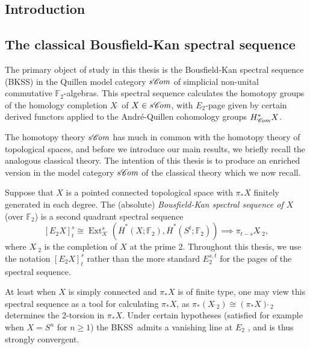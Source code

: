 \documentclass[11pt]{amsart} \renewcommand{\baselinestretch}{1.2}
\theoremstyle{plain}
\numberwithin{equation}{section} %
\theoremstyle{plain}
\numberwithin{equation}{chapter} %
\DeclareMathOperator{\Ext}{Ext}
\newcommand{\scrL}{\mathscr{L}}
\newcommand{\scrC}{\mathscr{C}}
\newcommand{\calk}{\mathcal{K}}
\newcommand{\F}{\mathbb{F}}
\newcommand{\algs}{{\scrC\!\textit{\normalfont\textit{om}}}}
\newcommand{\liealgs}{{\scrL\!\textit{ie}}}
\newcommand{\Ftwo}{\F_2}
\newcommand{\E}[5]{[E^{#1}_{#2}#3]^{#4}_{#5}}
\newcommand{\BKSS}{BKSS}
\newcommand{\SectionOrChapter}[1]{\section{\textbf{#1}}}
\newcommand{\SubsectionOrSection}[1]{\subsection{#1}}
\begin{document}
\begin{Introduction}
\SectionOrChapter{Introduction}
\label{intropart1}

\SubsectionOrSection{The classical Bousfield-Kan spectral sequence}
\label{Classicalstuff}

The primary object of study in this thesis is the Bousfield-Kan spectral sequence (\BKSS) in the Quillen model category $s\algs$ of simplicial non-unital commutative  $\Ftwo$-algebras. This spectral sequence  calculates the homotopy groups of the homology completion $X\hat{\ }$ of $X\in s\algs$, with $E_2$-page given by certain derived functors applied to the Andr\'e-Quillen cohomology groups $H^*_{\algs}X$. 

The homotopy theory $s\algs$ has much in common with the homotopy theory of topological spaces,  and before we introduce our main results, we briefly recall the analogous classical theory. 
The intention of this thesis is to produce an enriched version in the model category $s\algs$ of the classical theory which we now recall. %

Suppose that $X$ is a pointed connected topological space with $\pi_*X$ finitely generated in each degree. 
The (absolute) \emph{Bousfield-Kan spectral sequence of $X$} (over $\Ftwo$) is a second quadrant spectral sequence
\[\E{}{2}{X}{s}{t}\cong \Ext^s_{\calk}(\overline{H}^*(X;\Ftwo),\overline{H}^*(S^t;\Ftwo))\implies \pi_{t-s}X\hat{\ }_{\!\!\!2},\]
where $X\hat{\ }_{\!\!\!2}$ is the completion of $X$ at the prime 2. Throughout this thesis, we use the notation $\E{}{2}{X}{s}{t}$ rather than the more standard $E_{2}^{s,t}$ for the pages of the spectral sequence.


At least when $X$ is simply connected and $\pi_*X$ is of finite type, one may view this spectral sequence as  a tool for calculating $\pi_*X$, as
$\pi_*(X\hat{\ }_{\!\!\!2})\cong (\pi_*X)\hat{\ }_{\!\!\!2}$
determines the 2-torsion in $\pi_*X$. Under certain hypotheses (satisfied for example when $X=S^n$ for $n\geq1$) the \BKSS\ admits a vanishing line at $E_2$  \cite{MR0266212}, and is thus strongly convergent.


\end{Introduction}
\end{document}
